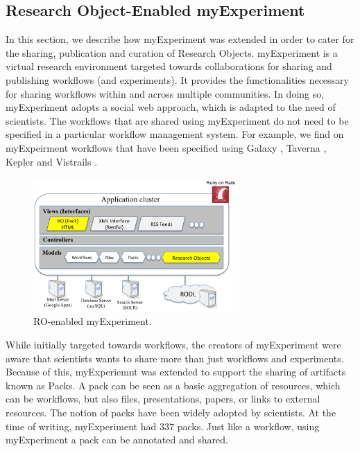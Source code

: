 \subsection{Research Object-Enabled myExperiment}
\label{sec:myexperiment}


In this section, we describe how myExperiment \cite{DBLP:journals/fgcs/RoureGS09} was extended in order to cater for the sharing, publication and curation of Research Objects. myExperiment is a virtual research environment targeted towards collaborations for sharing and publishing workflows (and experiments). It provides the functionalities necessary for sharing workflows within and across multiple communities. In doing so, myExperiment adopts a social web approach, which is adapted to the need of scientists. The workflows that are shared using myExperiment do not need to be specified in a particular workflow management system. For example, we find on myExpeirment workflows that have been specified using Galaxy \cite{galaxy}, Taverna \cite{taverna}, Kepler \cite{kepler} and Vistrails \cite{vistrails}.

\begin{figure}
\begin{center}
\includegraphics[width=0.7\textwidth]{Figures/myexperimentArchitecture.png}
\end{center}
\caption{RO-enabled myExperiment.}
\label{fig:myexperimentarchitecture}
\end{figure}


While initially targeted towards workflows, the creators of myExperiment were aware that scientists wants to share more than just workflows and experiments. Because of this, myExperiemnt was extended to support the sharing of artifacts known as Packs. A pack can be seen as a basic aggregation of resources, which can be workflows, but also files, presentations, papers, or links to external resources. 
The notion of packs have been widely adopted by scientists. At the time of writing, myExperiment had $337$ packs. Just like a workflow, using myExperiment a pack can be annotated and shared. 
 
